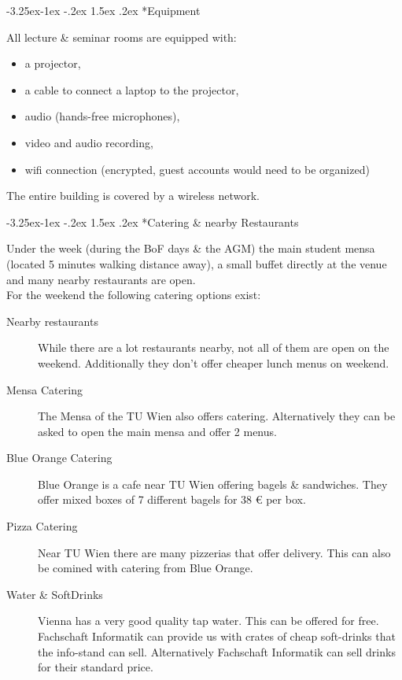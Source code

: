 \documentclass[10pt,a4paper]{article}
\makeatletter
\renewcommand\subsubsection{%
\@startsection{subsubsection}{2}{\z@}%
              {-3.25ex\@plus -1ex \@minus -.2ex}%
              {1.5ex \@plus .2ex}%
              {\color{kdedarker}\sffamily\large\bfseries}}
\makeatother
\begin{document}
\subsubsection*{Equipment}
All lecture \& seminar rooms are equipped with:
\begin{itemize}
	\item a projector,
	\item a cable to connect a laptop to the projector,
	\item audio (hands-free microphones),
	\item video and audio recording,
	\item wifi connection (encrypted, guest accounts would need to be organized)
\end{itemize}

The entire building is covered by a wireless network.

\subsubsection*{Catering \& nearby Restaurants}
Under the week (during the BoF days \& the AGM) the main student mensa (located 5 minutes walking distance away), a small buffet directly at the venue and many nearby restaurants are open.\\
For the weekend the following catering options exist:
\begin{description}
\item[\color{kdedarker} Nearby restaurants] While there are a lot restaurants nearby, not all of them are open on the weekend. Additionally they don't offer cheaper lunch menus on weekend.
\item[\color{kdedarker} Mensa Catering] The Mensa of the TU Wien also offers catering. Alternatively they can be asked to open the main mensa and offer 2 menus.
\item[\color{kdedarker} Blue Orange Catering] Blue Orange is a cafe near TU Wien offering bagels \& sandwiches. They offer mixed boxes of 7 different bagels for 38 \euro{} per box.
\item[\color{kdedarker} Pizza Catering] Near TU Wien there are many pizzerias that offer delivery. This can also be comined with catering from Blue Orange.
\item[\color{kdedarker} Water \& SoftDrinks] Vienna has a very good quality tap water. This can be offered for free. Fachschaft Informatik can provide us with crates of cheap soft-drinks that the info-stand can sell. Alternatively Fachschaft Informatik can sell drinks for their standard price.
\end{description}
\end{document}
